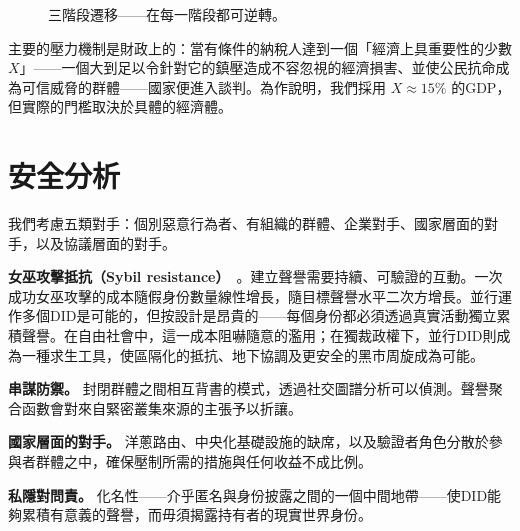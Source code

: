 \documentclass[11pt,a4paper,twocolumn]{article}
\begin{document}
\begin{figure}[ht]
\centering
{}
\caption{三階段遷移——在每一階段都可逆轉。}
\label{fig:migration}
\end{figure}

主要的壓力機制是財政上的：當有條件的納稅人達到一個「經濟上具重要性的少數 $X$」——一個大到足以令針對它的鎮壓造成不容忽視的經濟損害、並使公民抗命成為可信威脅的群體——國家便進入談判。為作說明，我們採用 $X \approx 15\%$ 的GDP，但實際的門檻取決於具體的經濟體。

\section{安全分析}

我們考慮五類對手：個別惡意行為者、有組織的群體、企業對手、國家層面的對手，以及協議層面的對手。

\textbf{女巫攻擊抵抗（Sybil resistance）}~\cite{douceur2002}。建立聲譽需要持續、可驗證的互動。一次成功女巫攻擊的成本隨假身份數量線性增長，隨目標聲譽水平二次方增長。並行運作多個DID是可能的，但按設計是昂貴的——每個身份都必須透過真實活動獨立累積聲譽。在自由社會中，這一成本阻嚇隨意的濫用；在獨裁政權下，並行DID則成為一種求生工具，使區隔化的抵抗、地下協調及更安全的黑市周旋成為可能。

\textbf{串謀防禦。} 封閉群體之間相互背書的模式，透過社交圖譜分析可以偵測。聲譽聚合函數會對來自緊密叢集來源的主張予以折讓。

\textbf{國家層面的對手。} 洋蔥路由、中央化基礎設施的缺席，以及驗證者角色分散於參與者群體之中，確保壓制所需的措施與任何收益不成比例。

\textbf{私隱對問責。} 化名性——介乎匿名與身份披露之間的一個中間地帶——使DID能夠累積有意義的聲譽，而毋須揭露持有者的現實世界身份。
\end{document}
